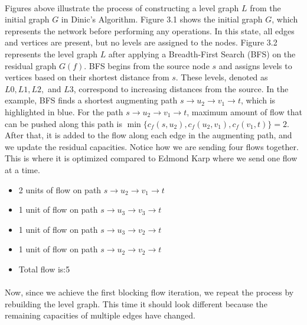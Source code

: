 \begin{enumerate}
\paragraph{}Figures above illustrate the process of constructing a level graph \( L \) from the initial graph \( G \) in Dinic's Algorithm. Figure 3.1 shows the initial graph \( G \), which represents the network before performing any operations. In this state, all edges and vertices are present, but no levels are assigned to the nodes. Figure 3.2 represents the level graph \( L \) after applying a Breadth-First Search (BFS) on the residual graph \( G(f) \). BFS begins from the source node \( s \) and assigns levels to vertices based on their shortest distance from \( s \). These levels, denoted as \( L0, L1, L2, \) and \( L3 \), correspond to increasing distances from the source. In the example, BFS finds a shortest augmenting path \( s \to u_2 \to v_1 \to t \), which is highlighted in blue. For the path \( s \to u_2 \to v_1 \to t \), maximum amount of flow that can be pushed along this path is $\min\{ c_f(s, u_2), c_f(u_2, v_1), c_f(v_1, t) \} = 2$. After that, it is added to the flow along each edge in the augmenting path, and we update the residual capacities. Notice how we are sending four flows together. This is where it is optimized compared to Edmond Karp where we send one flow at a time. 
\begin{itemize}
    \item 2 units of flow on path \( s \to u_2 \to v_1 \to t \)
    \item 1 unit of flow on path \( s \to u_3 \to v_3 \to t \)
    \item 1 unit of flow on path \( s \to u_3 \to v_2 \to t \)
    \item 1 unit of flow on path \( s \to u_2 \to v_2 \to t \)
    \item Total flow is:5
\end{itemize}

    
    \paragraph{} Now, since we achieve the first blocking flow iteration, we repeat the process by rebuilding the level graph. This time it should look different because the remaining capacities of multiple edges have changed.

    \begin{figure}[h]
        \centering
\end{figure}
\end{enumerate}
